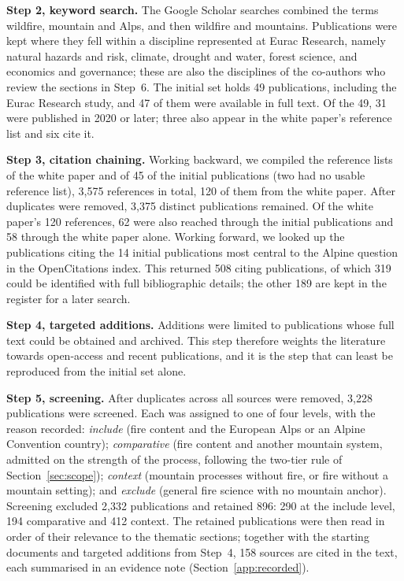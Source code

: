 \documentclass[11pt,a4paper]{article}
\begin{document}
\textbf{Step 2, keyword search.} The Google Scholar searches combined the terms wildfire, mountain and Alps, and then wildfire and mountains. Publications were kept where they fell within a discipline represented at Eurac Research, namely natural hazards and risk, climate, drought and water, forest science, and economics and governance; these are also the disciplines of the co-authors who review the sections in Step~6. The initial set holds 49 publications, including the Eurac Research study, and 47 of them were available in full text. Of the 49, 31 were published in 2020 or later; three also appear in the white paper's reference list and six cite it.

\textbf{Step 3, citation chaining.} Working backward, we compiled the reference lists of the white paper and of 45 of the initial publications (two had no usable reference list), 3{,}575 references in total, 120 of them from the white paper. After duplicates were removed, 3{,}375 distinct publications remained. Of the white paper's 120 references, 62 were also reached through the initial publications and 58 through the white paper alone. Working forward, we looked up the publications citing the 14 initial publications most central to the Alpine question in the OpenCitations index. This returned 508 citing publications, of which 319 could be identified with full bibliographic details; the other 189 are kept in the register for a later search.

\textbf{Step 4, targeted additions.} Additions were limited to publications whose full text could be obtained and archived. This step therefore weights the literature towards open-access and recent publications, and it is the step that can least be reproduced from the initial set alone.

\textbf{Step 5, screening.} After duplicates across all sources were removed, 3{,}228 publications were screened. Each was assigned to one of four levels, with the reason recorded: \emph{include} (fire content and the European Alps or an Alpine Convention country); \emph{comparative} (fire content and another mountain system, admitted on the strength of the process, following the two-tier rule of Section~\ref{sec:scope}); \emph{context} (mountain processes without fire, or fire without a mountain setting); and \emph{exclude} (general fire science with no mountain anchor). Screening excluded 2{,}332 publications and retained 896: 290 at the include level, 194 comparative and 412 context. The retained publications were then read in order of their relevance to the thematic sections; together with the starting documents and targeted additions from Step~4, 158 sources are cited in the text, each summarised in an evidence note (Section~\ref{app:recorded}).
\end{document}
